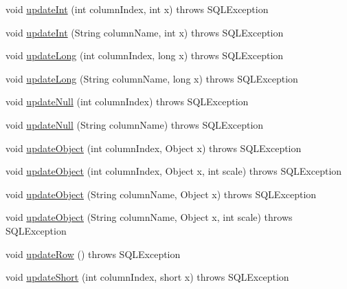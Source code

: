 \begin{DoxyCompactItemize}
\item 
void \mbox{\hyperlink{classcom_1_1mysql_1_1jdbc_1_1_updatable_result_set_a888635ba4ba026167fe0d1ba6a0739d0}{update\+Int}} (int column\+Index, int x)  throws S\+Q\+L\+Exception 
\item 
void \mbox{\hyperlink{classcom_1_1mysql_1_1jdbc_1_1_updatable_result_set_a8a46dadedadd27401fd4fdd849b1ac2f}{update\+Int}} (String column\+Name, int x)  throws S\+Q\+L\+Exception 
\item 
void \mbox{\hyperlink{classcom_1_1mysql_1_1jdbc_1_1_updatable_result_set_a53f2a28ae9fde4bd075d46a0b94dab63}{update\+Long}} (int column\+Index, long x)  throws S\+Q\+L\+Exception 
\item 
void \mbox{\hyperlink{classcom_1_1mysql_1_1jdbc_1_1_updatable_result_set_a35881cdc339f9cc77868b0b89955a36a}{update\+Long}} (String column\+Name, long x)  throws S\+Q\+L\+Exception 
\item 
void \mbox{\hyperlink{classcom_1_1mysql_1_1jdbc_1_1_updatable_result_set_a37fe836a746ef0fbbf56ca12092abedf}{update\+Null}} (int column\+Index)  throws S\+Q\+L\+Exception 
\item 
void \mbox{\hyperlink{classcom_1_1mysql_1_1jdbc_1_1_updatable_result_set_a6c296ecb4dc31d5ab887aa35b37c3996}{update\+Null}} (String column\+Name)  throws S\+Q\+L\+Exception 
\item 
void \mbox{\hyperlink{classcom_1_1mysql_1_1jdbc_1_1_updatable_result_set_aa7aa1f38330acdf684c1b9d8e8c2fb95}{update\+Object}} (int column\+Index, Object x)  throws S\+Q\+L\+Exception 
\item 
void \mbox{\hyperlink{classcom_1_1mysql_1_1jdbc_1_1_updatable_result_set_ae3c19f739c122b5b6766b868f6bc39a6}{update\+Object}} (int column\+Index, Object x, int scale)  throws S\+Q\+L\+Exception 
\item 
void \mbox{\hyperlink{classcom_1_1mysql_1_1jdbc_1_1_updatable_result_set_abf296b039e8adf6ac5b8a2aabaac86a7}{update\+Object}} (String column\+Name, Object x)  throws S\+Q\+L\+Exception 
\item 
void \mbox{\hyperlink{classcom_1_1mysql_1_1jdbc_1_1_updatable_result_set_ae0fe84cc37c1b19c829fd325f1e7e60f}{update\+Object}} (String column\+Name, Object x, int scale)  throws S\+Q\+L\+Exception 
\item 
void \mbox{\hyperlink{classcom_1_1mysql_1_1jdbc_1_1_updatable_result_set_a919969ba4b3c7cbc7b18605e9f31a746}{update\+Row}} ()  throws S\+Q\+L\+Exception 
\item 
void \mbox{\hyperlink{classcom_1_1mysql_1_1jdbc_1_1_updatable_result_set_a0ff435a274f3c9b111fe0733274b1a48}{update\+Short}} (int column\+Index, short x)  throws S\+Q\+L\+Exception 

\end{DoxyCompactItemize}
